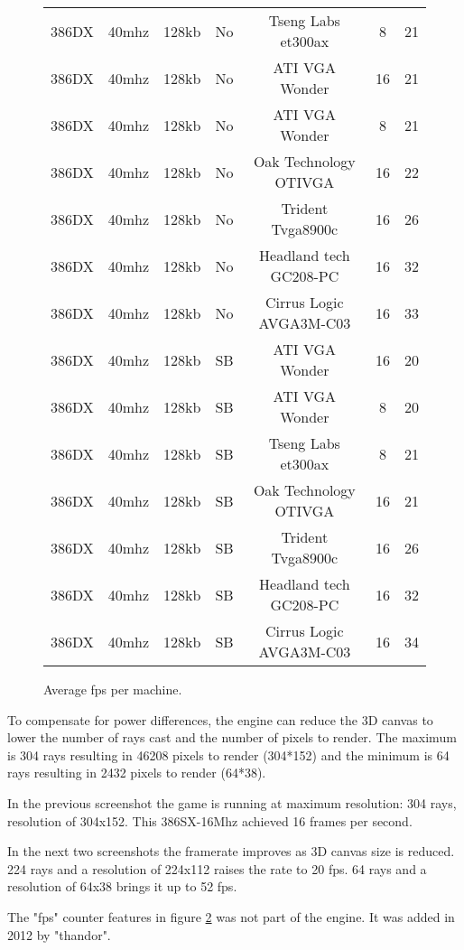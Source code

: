 \begin{figure}[H]
\begin{tabularx}{\textwidth}{ c  c c  c  c c c }
386DX &	40mhz	&128kb		& No & Tseng Labs et300ax	& 8	& 21 \\
386DX &	40mhz	&128kb		& No & ATI VGA Wonder	& 16	& 21 \\
386DX &	40mhz	&128kb		& No & ATI VGA Wonder	& 8	& 21 \\
386DX &	40mhz	&128kb		& No & Oak Technology OTIVGA  & 	16	&	22 \\
386DX &	40mhz	&128kb		& No &  Trident Tvga8900c	& 16	&	26 \\
386DX &	40mhz	&128kb		& No & Headland tech GC208-PC	& 16	&	32 \\
386DX &	40mhz	&128kb		& No & Cirrus Logic AVGA3M-C03	& 16	&	33 \\ \bottomrule

386DX &	40mhz	&128kb		& SB	& ATI VGA Wonder	& 16	& 20 \\
386DX &	40mhz	&128kb		& SB	& ATI VGA Wonder	& 8	& 20 \\
386DX &	40mhz	&128kb		& SB	& Tseng Labs et300ax	& 8	& 21 \\
386DX &	40mhz	&128kb		& SB	& Oak Technology OTIVGA  & 	16	&	21 \\
386DX &	40mhz	&128kb		& SB	&  Trident Tvga8900c	& 16	&	26 \\
386DX &	40mhz	&128kb		& SB	& Headland tech GC208-PC	& 16	&	32 \\
386DX &	40mhz	&128kb		& SB &	Cirrus Logic AVGA3M-C03	& 16	&	34 \\ \bottomrule
\end{tabularx}
\caption{Average fps per machine.}
\label{perf_summary}
\end{figure}



To compensate for power differences, the engine can reduce the 3D canvas to lower the number of rays cast and the number of pixels to render. The maximum is 304 rays resulting in 46208 pixels to render (304*152) and the minimum is 64 rays resulting in 2432 pixels to render (64*38).\\
  \begin{figure}[H]
\centering
 \caption{}
 \label{fpscounter}
 \end{figure}
 \par
 In the previous screenshot the game is running at maximum resolution: 304 rays, resolution of 304x152. This 386SX-16Mhz achieved 16 frames per second.\\
 \par
 In the next two screenshots the framerate improves as 3D canvas size is reduced. 224 rays and a resolution of 224x112 raises the rate to 20 fps. 64 rays and a resolution of 64x38 brings it up to 52 fps.\\
 \par
  The "fps" counter features in figure \ref{fpscounter} was not part of the engine. It was added in 2012 by "thandor".

